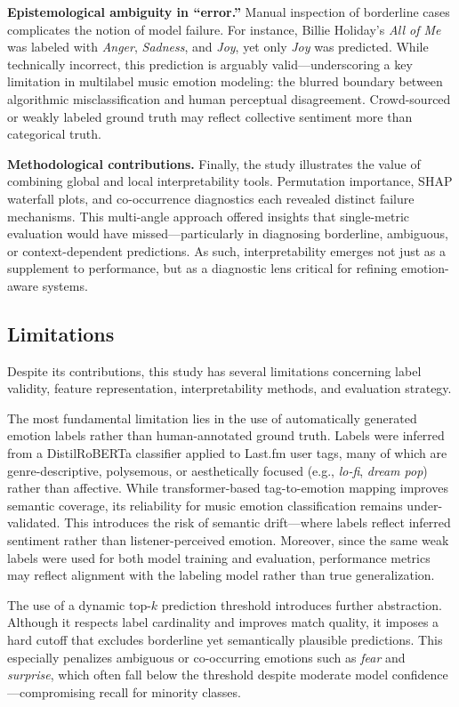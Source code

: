 \documentclass{article}
\begin{document}
\textbf{Epistemological ambiguity in “error.”} Manual inspection of borderline cases complicates the notion of model failure. For instance, Billie Holiday’s \textit{All of Me} was labeled with \textit{Anger}, \textit{Sadness}, and \textit{Joy}, yet only \textit{Joy} was predicted. While technically incorrect, this prediction is arguably valid—underscoring a key limitation in multilabel music emotion modeling: the blurred boundary between algorithmic misclassification and human perceptual disagreement. Crowd-sourced or weakly labeled ground truth may reflect collective sentiment more than categorical truth.

\textbf{Methodological contributions.} Finally, the study illustrates the value of combining global and local interpretability tools. Permutation importance, SHAP waterfall plots, and co-occurrence diagnostics each revealed distinct failure mechanisms. This multi-angle approach offered insights that single-metric evaluation would have missed—particularly in diagnosing borderline, ambiguous, or context-dependent predictions. As such, interpretability emerges not just as a supplement to performance, but as a diagnostic lens critical for refining emotion-aware systems.

\subsection{Limitations}

Despite its contributions, this study has several limitations concerning label validity, feature representation, interpretability methods, and evaluation strategy.

The most fundamental limitation lies in the use of automatically generated emotion labels rather than human-annotated ground truth. Labels were inferred from a DistilRoBERTa classifier applied to Last.fm user tags, many of which are genre-descriptive, polysemous, or aesthetically focused (e.g., \textit{lo-fi}, \textit{dream pop}) rather than affective. While transformer-based tag-to-emotion mapping improves semantic coverage, its reliability for music emotion classification remains under-validated. This introduces the risk of semantic drift—where labels reflect inferred sentiment rather than listener-perceived emotion. Moreover, since the same weak labels were used for both model training and evaluation, performance metrics may reflect alignment with the labeling model rather than true generalization.

The use of a dynamic top-$k$ prediction threshold introduces further abstraction. Although it respects label cardinality and improves match quality, it imposes a hard cutoff that excludes borderline yet semantically plausible predictions. This especially penalizes ambiguous or co-occurring emotions such as \textit{fear} and \textit{surprise}, which often fall below the threshold despite moderate model confidence—compromising recall for minority classes.
\end{document}
